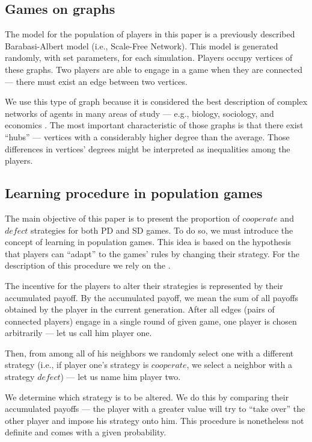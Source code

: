 \documentclass[english, twoside, 12pt, a4paper]{article}
\theoremstyle{definition}
\theoremstyle{plain}
\theoremstyle{remark}
\begin{document}
\subsection{Games on graphs}

The model for the population of players in this paper is a previously described Barabasi-Albert model (i.e., Scale-Free Network). This model is generated randomly, with set parameters, for each simulation. Players occupy vertices of these graphs. Two players are able to engage in a game when they are connected --- there must exist an edge between two vertices. 

We use this type of graph because it is considered the best description of complex networks of agents in many areas of study --- e.g., biology, sociology, and economics \citep{volchenkov2002epidemic}. The most important characteristic of those graphs is that there exist \enquote{hubs} --- vertices with a considerably higher degree than the average. Those differences in vertices' degrees might be interpreted as inequalities among the players. 

\subsection{Learning procedure in population games}

The main objective of this paper is to present the proportion of $cooperate$ and $defect$ strategies for both PD and SD games. To do so, we must introduce the concept of learning in population games. This idea is based on the hypothesis that players can \enquote{adapt} to the games' rules by changing their strategy. For the description of this procedure we rely on the \cite{santos2005scale}. 

The incentive for the players to alter their strategies is represented by their accumulated payoff. By the accumulated payoff, we mean the sum of all payoffs obtained by the player in the current generation. 
After all edges (pairs of connected players) engage in a single round of given game, one player is chosen arbitrarily --- let us call him player one. 

Then, from among all of his neighbors we randomly select one with a different strategy (i.e., if player one's strategy is $cooperate$, we select a neighbor with a strategy $defect$) --- let us name him player two.

We determine which strategy is to be altered. We do this by comparing their accumulated payoffs --- the player with a greater value will try to \enquote{take over} the other player and impose his strategy onto him. This procedure is nonetheless not definite and comes with a given probability. 
\end{document}
